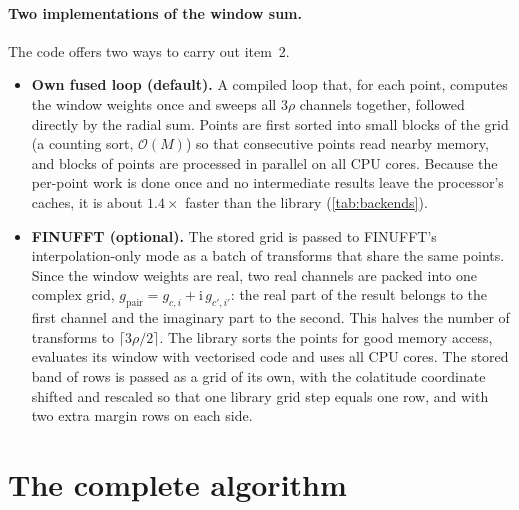 \documentclass[11pt,a4paper]{article}
\theoremstyle{definition}
\newcommand{\Oh}{\mathcal{O}}
\newcommand{\ii}{\mathrm{i}}
\begin{document}
\paragraph{Two implementations of the window sum.} The code offers two ways to carry out item~2.
\begin{itemize}
\item \textbf{Own fused loop (default).} A compiled loop that, for each point, computes the window weights once and sweeps all $3\rho$ channels
  together, followed directly by the radial sum. Points are first sorted into small blocks of the grid (a counting sort, $\Oh(M)$) so that
  consecutive points read nearby memory, and blocks of points are processed in parallel on all CPU cores. Because the per-point work is done once
  and no intermediate results leave the processor's caches, it is about $1.4\times$ faster than the library (\cref{tab:backends}).
\item \textbf{FINUFFT (optional).} The stored grid is passed to FINUFFT's interpolation-only mode as a batch of transforms that share the same
  points. Since the window weights are real, two real channels are packed into one complex grid, $g_{\text{pair}}=g_{c,i}+\ii\,g_{c',i'}$: the real part of the
  result belongs to the first channel and the imaginary part to the second. This halves the number of transforms to $\lceil3\rho/2\rceil$. The library
  sorts the points for good memory access, evaluates its window with vectorised code and uses all CPU cores. The stored band of rows is passed as a
  grid of its own, with the colatitude coordinate shifted and rescaled so that one library grid step equals one row, and with two extra margin rows
  on each side.
\end{itemize}

\section{The complete algorithm}\label{sec:algorithm}
\end{document}

